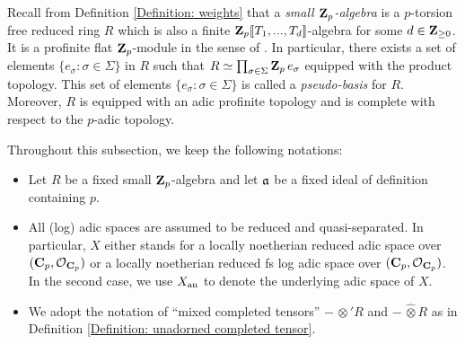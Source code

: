 Recall from Definition \ref{Definition: weights} that a \emph{small $\operatorname{\mathbf{Z}}_p$-algebra} is a $p$-torsion free reduced ring $R$ which is also a finite $\operatorname{\mathbf{Z}}_p\operatorname{\![\![\!} T_1, ..., T_d\operatorname{\!]\!]}$-algebra for some $d\in \operatorname{\mathbf{Z}}_{\geq 0}$. It is a profinite flat $\operatorname{\mathbf{Z}}_p$-module in the sense of \cite[Definition 6.1]{CHJ-2017}. In particular, there exists a set of elements $\{e_\sigma: \sigma\in \Sigma\}$ in $R$ such that $R\simeq \prod_{\sigma\in \Sigma}\operatorname{\mathbf{Z}}_pe_\sigma$ equipped with the product topology. This set of elements $\{e_{\sigma}: \sigma\in \Sigma\}$ is called a \emph{pseudo-basis} for $R$. Moreover, $R$ is equipped with an adic profinite topology and is complete with respect to the $p$-adic topology. 

Throughout this subsection, we keep the following notations:
\begin{itemize}
\item Let $R$ be a fixed small $\operatorname{\mathbf{Z}}_p$-algebra and let $\operatorname{\mathfrak{a}}$ be a fixed ideal of definition containing $p$.
\item All (log) adic spaces are assumed to be reduced and quasi-separated. In particular, $X$ either stands for a locally noetherian reduced adic space over $(\operatorname{\mathbf{C}}_p, \operatorname{\mathcal{O}}_{\operatorname{\mathbf{C}}_p})$ or a locally noetherian reduced fs log adic space over $(\operatorname{\mathbf{C}}_p, \operatorname{\mathcal{O}}_{\operatorname{\mathbf{C}}_p})$. In the second case, we use $X_{\operatorname{an}}$ to denote the underlying adic space of $X$.
\item We adopt the notation of ``mixed completed tensors'' $-\,\widehat{\otimes}'R$ and $-\,\widehat{\otimes}R$ as in Definition \ref{Definition: unadorned completed tensor}.
\end{itemize}

